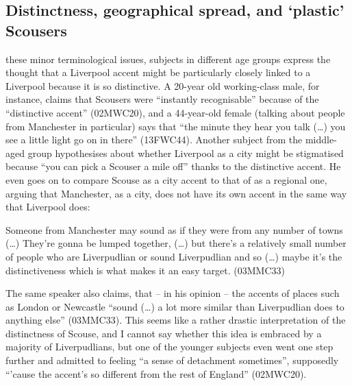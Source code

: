\subsection{Distinctness, geographical spread, and `plastic' Scousers}

 these minor terminological issues, subjects in different age groups express the thought that a Liverpool accent might be particularly closely linked to a Liverpool  because it is so distinctive.
A 20-year old working-class male, for instance, claims that Scousers were ``instantly recognisable'' because of the ``distinctive accent'' (02MWC20), and a 44-year-old female (talking about people from Manchester in particular) says that ``the minute they hear you talk (\ldots) you see a little light go on in there'' (13FWC44).
Another subject from the middle-aged group hypothesises about whether Liverpool as a city might be stigmatised because ``you can pick a Scouser a mile off'' thanks to the distinctive accent.
He even goes on to compare Scouse as a city accent to that of  as a regional one, arguing that Manchester, as a city, does not have its own accent in the same way that Liverpool does:

\begin{example}
	Someone from Manchester may sound as if they were from any number of towns (\ldots) They're gonna be lumped together, (\ldots) but there's a relatively small number of people who are Liverpudlian or sound Liverpudlian and so (\ldots) maybe it's the distinctiveness which is what makes it an easy target. (03MMC33)
\end{example}

The same speaker also claims, that -- in his opinion -- the accents of places such as London or Newcastle ``sound (\ldots) a lot more similar than Liverpudlian does to anything else'' (03MMC33).
This seems like a rather drastic interpretation of the distinctness of Scouse, and I cannot say whether this idea is embraced by a majority of Liverpudlians, but one of the younger subjects even went one step further and admitted to feeling ``a sense of detachment sometimes'', supposedly ``'cause the accent's so different from the rest of England'' (02MWC20).

